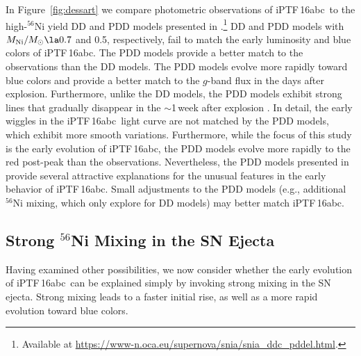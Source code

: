 \documentclass[twocolumn]{aastex61}
\newcommand{\abc}{iPTF\,16abc}
\begin{document}
In Figure~\ref{fig:dessart} we compare photometric observations of \abc\ to
the high-$^{56}$Ni yield DD and PDD models presented in
\citet{2014MNRAS.441..532D}.\footnote{Available at
\url{https://www-n.oca.eu/supernova/snia/snia_ddc_pddel.html}.} DD and PDD
models with $M_\mathrm{Ni}/M_\odot \la 0.7$ and 0.5, respectively, fail to
match the early luminosity and blue colors of \abc. The PDD models provide a
better match to the observations than the DD models. The PDD models evolve
more rapidly toward blue colors and provide a better match to the $g$-band
flux in the days after explosion. Furthermore, unlike the DD models, the PDD
models exhibit strong  lines that gradually disappear in the
$\sim$1\,week after explosion \citep{2014MNRAS.441..532D}. In detail, the
early wiggles in the \abc\ light curve are not matched by the PDD models,
which exhibit more smooth variations. Furthermore, while the focus of this
study is the early evolution of \abc, the PDD models evolve more rapidly to
the red post-peak than the observations. Nevertheless, the PDD models
presented in \citet{2014MNRAS.441..532D} provide several attractive
explanations for the unusual features in the early behavior of \abc. Small
adjustments to the PDD models (e.g., additional $^{56}$Ni mixing, which
\citeauthor{2014MNRAS.441..532D} only explore for DD models) may better
match \abc.

\subsection{Strong $^{56}$Ni Mixing in the SN Ejecta}
\label{sec:Ni_mixing}

Having examined other possibilities, we now consider whether the early
evolution of \abc\ can be explained simply by invoking strong mixing in the
SN ejecta. Strong mixing leads to a faster initial rise, as well as a more
rapid evolution toward blue colors.
\end{document}
